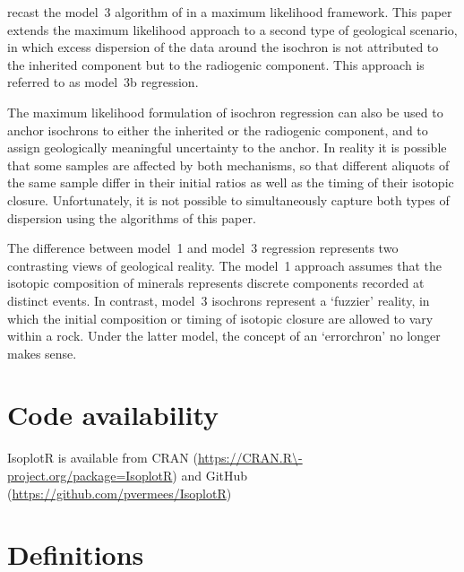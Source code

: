 \documentclass{article}
\begin{document}
\citet{titterington1979} recast the model~3 algorithm of
\citet{mcintyre1966} in a maximum likelihood framework. This paper
extends the maximum likelihood approach to a second type of geological
scenario, in which excess dispersion of the data around the isochron
is not attributed to the inherited component but to the radiogenic
component. This approach is referred to as model~3b
regression.\medskip

The maximum likelihood formulation of isochron regression can also be
used to anchor isochrons to either the inherited or the radiogenic
component, and to assign geologically meaningful uncertainty to the
anchor. In reality it is possible that some samples are affected by
both mechanisms, so that different aliquots of the same sample differ
in their initial ratios as well as the timing of their isotopic
closure. Unfortunately, it is not possible to simultaneously capture
both types of dispersion using the algorithms of this paper.\medskip

The difference between model~1 and model~3 regression represents two
contrasting views of geological reality. The model~1 approach assumes
that the isotopic composition of minerals represents discrete
components recorded at distinct events. In contrast, model~3 isochrons
represent a `fuzzier' reality, in which the initial composition or
timing of isotopic closure are allowed to vary within a rock. Under
the latter model, the concept of an `errorchron' no longer makes
sense.

\section*{Code availability}

IsoplotR is available from CRAN
(\url{https://CRAN.R\-project.org/package=IsoplotR}) and GitHub
(\url{https://github.com/pvermees/IsoplotR})


\appendix

\section{Definitions}\label{app:definitions}
\end{document}
